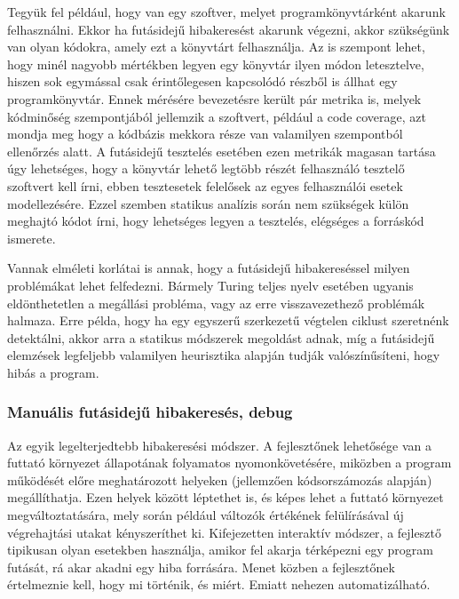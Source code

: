\documentclass[a4paper,12pt]{report}
\begin{document}
Tegyük fel például, hogy van egy szoftver, melyet programkönyvtárként akarunk felhasználni. Ekkor ha futásidejű hibakeresést akarunk végezni, akkor szükségünk van olyan kódokra, amely ezt a könyvtárt felhasználja. Az is szempont lehet, hogy minél nagyobb mértékben legyen egy könyvtár ilyen módon letesztelve, hiszen sok egymással csak érintőlegesen kapcsolódó részből is állhat egy programkönyvtár. Ennek mérésére bevezetésre került pár metrika is, melyek kódminőség szempontjából jellemzik a szoftvert, például a code coverage, azt mondja meg hogy a kódbázis mekkora része van valamilyen szempontból ellenőrzés alatt. A futásidejű tesztelés esetében ezen metrikák magasan tartása úgy lehetséges, hogy a könyvtár lehető legtöbb részét felhasználó tesztelő szoftvert kell írni, ebben tesztesetek felelősek az egyes felhasználói esetek modellezésére. Ezzel szemben statikus analízis során nem szükségek külön meghajtó kódot írni, hogy lehetséges legyen a tesztelés, elégséges a forráskód ismerete.

Vannak elméleti korlátai is annak, hogy a futásidejű hibakereséssel milyen problémákat lehet felfedezni. Bármely Turing teljes nyelv esetében ugyanis eldönthetetlen a megállási probléma, vagy az erre visszavezethező problémák halmaza. Erre példa, hogy ha egy egyszerű szerkezetű végtelen ciklust szeretnénk detektálni, akkor arra a statikus módszerek megoldást adnak, míg a futásidejű elemzések legfeljebb valamilyen heurisztika alapján tudják valószínűsíteni, hogy hibás a program.

\subsubsection{Manuális futásidejű hibakeresés, debug}
Az egyik legelterjedtebb hibakeresési módszer. A fejlesztőnek lehetősége van a futtató környezet állapotának folyamatos nyomonkövetésére, miközben a program működését előre meghatározott helyeken (jellemzően kódsorszámozás alapján) megállíthatja. Ezen helyek között léptethet is, és képes lehet a futtató környezet megváltoztatására, mely során például változók értékének felülírásával új végrehajtási utakat kényszeríthet ki. Kifejezetten interaktív módszer, a fejlesztő tipikusan olyan esetekben használja, amikor fel akarja térképezni egy program futását, rá akar akadni egy hiba forrására. Menet közben a fejlesztőnek értelmeznie kell, hogy mi történik, és miért. Emiatt nehezen automatizálható.
\end{document}
